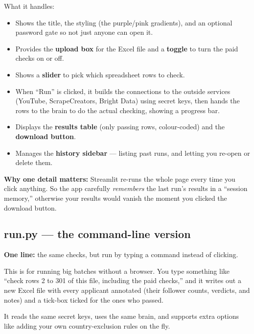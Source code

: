 \documentclass[11pt]{article}
\begin{document}
What it handles:
\begin{itemize}
  \item Shows the title, the styling (the purple/pink gradients), and an
  optional password gate so not just anyone can open it.
  \item Provides the \textbf{upload box} for the Excel file and a \textbf{toggle}
  to turn the paid checks on or off.
  \item Shows a \textbf{slider} to pick which spreadsheet rows to check.
  \item When ``Run'' is clicked, it builds the connections to the outside
  services (YouTube, ScrapeCreators, Bright Data) using secret keys, then hands
  the rows to the brain to do the actual checking, showing a progress bar.
  \item Displays the \textbf{results table} (only passing rows, colour-coded)
  and the \textbf{download button}.
  \item Manages the \textbf{history sidebar} — listing past runs, and letting you
  re-open or delete them.
\end{itemize}

\begin{analogybox}
\textbf{Why one detail matters:} Streamlit re-runs the whole page every time you
click anything. So the app carefully \emph{remembers} the last run's results in
a ``session memory,'' otherwise your results would vanish the moment you clicked
the download button.
\end{analogybox}

\subsection{run.py — the command-line version}
\begin{plainbox}
\textbf{One line:} the same checks, but run by typing a command instead of
clicking.
\end{plainbox}

This is for running big batches without a browser. You type something like
``check rows 2 to 301 of this file, including the paid checks,'' and it writes
out a new Excel file with every applicant annotated (their follower counts,
verdicts, and notes) and a tick-box ticked for the ones who passed.

It reads the same secret keys, uses the same brain, and supports extra options
like adding your own country-exclusion rules on the fly.

\end{document}
